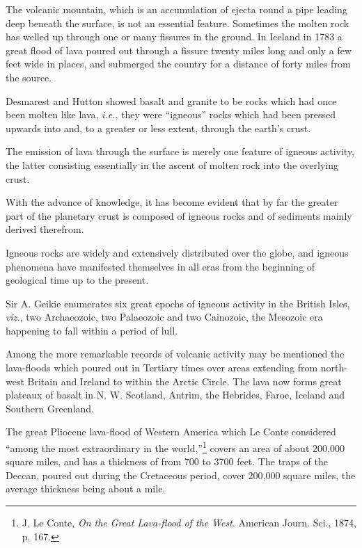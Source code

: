 \documentclass[a4paper, 12pt, oneside]{article}
\begin{document}
The volcanic mountain, which is an accumulation of ejecta round a pipe leading deep beneath the surface, is not an essential feature. Sometimes the molten rock has welled up through one or many fissures in the ground. In Iceland in 1783 a great flood of lava poured out through a fissure twenty miles long and only a few feet wide in places, and submerged the country for a distance of forty miles from the source.

Desmarest and Hutton showed basalt and granite to be rocks which had once been molten like lava, \emph{i.e.}, they were ``igneous'' rocks which had been pressed upwards into and, to a greater or less extent, through the earth's crust.

The emission of lava through the surface is merely one feature of igneous activity, the latter consisting essentially in the ascent of molten rock into the overlying crust.

With the advance of knowledge, it has become evident that by far the greater part of the planetary crust is composed of igneous rocks and of sediments mainly derived therefrom.

Igneous rocks are widely and extensively distributed over the globe, and igneous phenomena have manifested themselves in all eras from the beginning of geological time up to the present.

Sir A. Geikie enumerates six great epochs of igneous activity in the British Isles, \emph{viz.}, two Archaeozoic, two Palaeozoic and two Cainozoic, the Mesozoic era happening to fall within a period of lull.

Among the more remarkable records of volcanic activity may be mentioned the lava-floods which poured out in Tertiary times over areas extending from north-west Britain and Ireland to within the Arctic Circle. The lava now forms great plateaux of basalt in N. W. Scotland, Antrim, the Hebrides, Faroe, Iceland and Southern Greenland.

The great Pliocene lava-flood of Western America which Le Conte considered ``among the most extraordinary in the world,''\footnote{J. Le Conte, \emph{On the Great Lava-flood of the West}. American Journ. Sci., 1874, p. 167.} covers an area of about 200,000 square miles, and has a thickness of from 700 to 3700 feet. The traps of the Deccan, poured out during the Cretaceous period, cover 200,000 square miles, the average thickness being about a mile.
\end{document}
